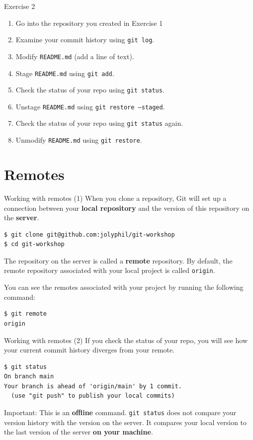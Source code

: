 \documentclass[handout]{beamer}
\begin{document}
\begin{frame}{Exercise 2}
	\begin{enumerate}
		\item Go into the repository you created in Exercise 1
		\item Examine your commit history using \texttt{git log}.
		\item Modify \texttt{README.md} (add a line of text).
		\item Stage \texttt{README.md} using \texttt{git add}. 
		\item Check the status of your repo using \texttt{git status}. 
		\item Unstage \texttt{README.md} using \texttt{git restore --staged}.
		\item Check the status of your repo using \texttt{git status} again. 
		\item Unmodify \texttt{README.md} using \texttt{git restore}.
	\end{enumerate}
\end{frame}

\section{Remotes}

\begin{frame}[fragile]{Working with remotes (1)}
	When you clone a repository, Git will set up a connection between your \textbf{local repository} and the version of this repository on the \textbf{server}. 
\begin{lstlisting}
$ git clone git@github.com:jolyphil/git-workshop
$ cd git-workshop
\end{lstlisting}
	The repository on the server is called a \textbf{remote} repository. By default, the remote repository associated with your local project is called \texttt{origin}.
	
\vspace{0.5cm}	
	
	You can see the remotes associated with your project by running the following command:
	
\begin{lstlisting}
$ git remote
origin
\end{lstlisting}
	
\end{frame}

\begin{frame}[fragile]{Working with remotes (2)}
If you check the status of your repo, you will see how your current commit history diverges from your remote. 
\begin{lstlisting}
$ git status
On branch main
Your branch is ahead of 'origin/main' by 1 commit.
  (use "git push" to publish your local commits)
\end{lstlisting}

\alert{Important:} This is an \textbf{offline} command. \texttt{git status} does not compare your version history with the version on the server. It compares your local version to the last version of the server \textbf{on your machine}. 

\end{frame}
\end{document}
